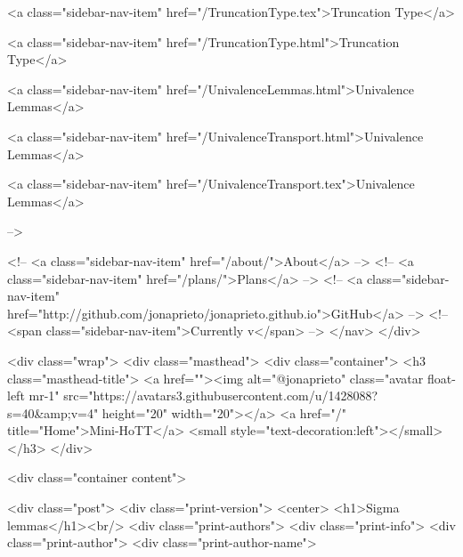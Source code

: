       
    
      
        
          <a class="sidebar-nav-item" href="/TruncationType.tex">Truncation Type</a>
        
      
    
      
        
          <a class="sidebar-nav-item" href="/TruncationType.html">Truncation Type</a>
        
      
    
      
        
          <a class="sidebar-nav-item" href="/UnivalenceLemmas.html">Univalence Lemmas</a>
        
      
    
      
        
          <a class="sidebar-nav-item" href="/UnivalenceTransport.html">Univalence Lemmas</a>
        
      
    
      
        
          <a class="sidebar-nav-item" href="/UnivalenceTransport.tex">Univalence Lemmas</a>
        
      
     -->

    <!-- <a class="sidebar-nav-item" href="/about/">About</a> -->
    <!-- <a class="sidebar-nav-item" href="/plans/">Plans</a> -->
    <!-- <a class="sidebar-nav-item" href="http://github.com/jonaprieto/jonaprieto.github.io">GitHub</a> -->
    <!-- <span class="sidebar-nav-item">Currently v</span> -->
  </nav>
</div>

    <div class="wrap">
      <div class="masthead">
        <div class="container">
          <h3 class="masthead-title">
            <a href=""><img alt="@jonaprieto" class="avatar float-left mr-1" src="https://avatars3.githubusercontent.com/u/1428088?s=40&amp;v=4" height="20" width="20"></a>
            <a href="/" title="Home">Mini-HoTT</a>
            <small style="text-decoration:left"></small>
          </h3>
        </div>
      
      <div class="container content">
        







<div class="post">
  <div class="print-version">
    <center>
      <h1>Sigma lemmas</h1><br/>
        <div class="print-authors">
          <div class="print-info">
            <div class="print-author">
              <div class="print-author-name">
                
